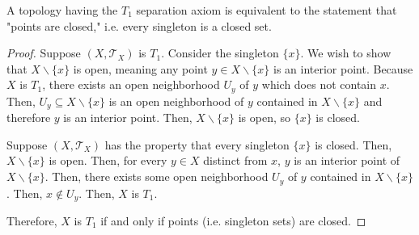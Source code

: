 \begin{framed}
\begin{center}
\end{center}
\vspace{-1em}
A topology having the $T_1$ separation axiom is equivalent to the statement that "points are closed," i.e. every singleton is a closed set. \vspace{-1em}\begin{proof}
    Suppose $(X,\mathcal{T}_X)$ is $T_1$. Consider the singleton $\{x\}$. We wish to show that $X\backslash\{x\}$ is open, meaning any point $y\in X\backslash \{x\}$ is an interior point. Because $X$ is $T_1$, there exists an open neighborhood $U_y$ of $y$ which does not contain $x$. Then, $U_y\subseteq X\backslash \{x\}$ is an open neighborhood of $y$ contained in $X\backslash \{x\}$ and therefore $y$ is an interior point. Then, $X\backslash \{x\}$ is open, so $\{x\}$ is closed.

    Suppose $(X,\mathcal{T}_X)$ has the property that every singleton $\{x\}$ is closed. Then, $X\backslash \{x\}$ is open. Then, for every $y\in X$ distinct from $x$, $y$ is an interior point of $X\backslash \{x\}$. Then, there exists some open neighborhood $U_y$ of $y$ contained in $X\backslash \{x\}$. Then, $x\notin U_y$. Then, $X$ is $T_1$.

    Therefore, $X$ is $T_1$ if and only if points (i.e. singleton sets) are closed.
\end{proof}


\end{framed}

